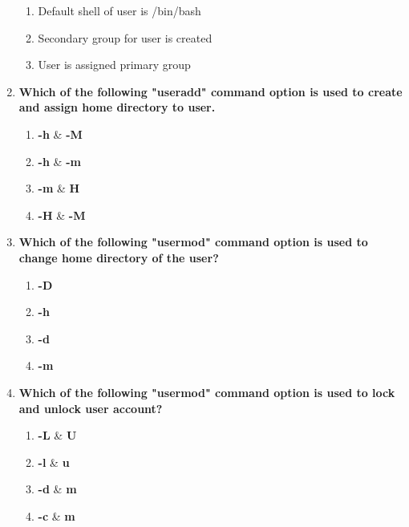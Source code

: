 \begin{flushleft}
\begin{enumerate}
\begin{enumerate}[label=(\alph*)]
			\item Default shell of user is /bin/bash    %
			\item Secondary group for user is created
			\item User is assigned primary group    %
		\end{enumerate}
		\bigskip
		\bigskip
		\item \textbf{Which of the following "useradd" command option is used to create and assign home directory to user.}
		\begin{enumerate}[label=(\alph*)]
			\item \textbf{-h} \& \textbf{-M}
			\item \textbf{-h} \& \textbf{-m}   %
			\item \textbf{-m} \& \textbf{H}
			\item \textbf{-H} \& \textbf{-M}
		\end{enumerate}
		\bigskip
		\bigskip
		\item \textbf{Which of the following "usermod" command option is used to change home directory of the user?}
		\begin{enumerate}[label=(\alph*)]
			\item \textbf{-D}
			\item \textbf{-h}
			\item \textbf{-d}   %
			\item \textbf{-m}
		\end{enumerate}
		\bigskip
		\bigskip
		\item \textbf{Which of the following "usermod" command option is used to lock and unlock user account?}
		\begin{enumerate}[label=(\alph*)]
			\item \textbf{-L} \& \textbf{U}  %
			\item \textbf{-l} \& \textbf{u} 
			\item \textbf{-d} \& \textbf{m}  
			\item \textbf{-c} \& \textbf{m}
		\end{enumerate}
	\end{enumerate}
	
	
\end{flushleft}
\newpage


